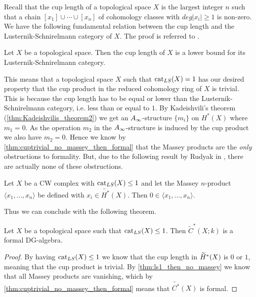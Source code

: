 Recall that the cup length of a topological space $X$ is the largest integer $n$ such that a chain $[x_1]\cup \cdots \cup [x_n]$ of cohomology classes with $deg|x_i|\geq 1$ is non-zero. We have the following fundamental relation between the cup length and the Lusternik-Schnirelmann category of $X$. The proof is referred to \cite{lscategorybook}.

\begin{lemma}
\label{lem:cup-length_lower_bound}
Let $X$ be a topological space. Then the cup length of $X$ is a lower bound for its Lusternik-Schnirelmann category. 
\end{lemma}

This means that a topological space $X$ such that $\text{cat}_{LS}(X)=1$ has our desired property that the cup product in the reduced cohomology ring of $X$ is trivial. This is because the cup length has to be equal or lower than the Lusternik-Schnirelmann category, i.e. less than or equal to $1$. By Kadeishvili's theorem (\cref{thm:Kadeishvilis_theorem2}) we get an $A_{\infty}$-structure $\{m_i\}$ on $H^*(X)$ where $m_1 =0$. As the operation $m_2$ in the $A_{\infty}$-structure is induced by the cup product we also have $m_2=0$. Hence we know by \ref{thm:cuptrivial_no_massey_then_formal} that the Massey products are the \emph{only} obstructions to formality. But, due to the following result by Rudyak in \cite[Lemma 4.6]{Rudyak}, there are actually none of these obstructions. 

\begin{theorem}
\label{thm:ls1_then_no_massey}
Let $X$ be a CW complex with $\text{cat}_{LS}(X)\leq 1$ and let the Massey $n$-product $\langle x_1, \ldots, x_n\rangle$ be defined with $x_i \in \widetilde{H^*}(X)$. Then $0\in \langle x_1, \ldots, x_n\rangle $.
\end{theorem}

Thus we can conclude with the following theorem. 

\begin{theorem}
\label{thm:ls1_then_reduced_formal}
Let $X$ be a topological space such that $\text{cat}_{LS}(X)\leq 1$. Then $\widetilde{C}^*(X;k)$ is a formal DG-algebra.
\end{theorem}
\begin{proof}
By having $\text{cat}_{LS}(X)\leq 1$ we know that the cup length in $\widetilde{H}^*(X)$ is $0$ or $1$, meaning that the cup product is trivial. By \cref{thm:ls1_then_no_massey} we know that all Massey products are vanishing, which by  \cref{thm:cuptrivial_no_massey_then_formal} means that $\widetilde{C^*}(X)$ is formal.
\end{proof}


